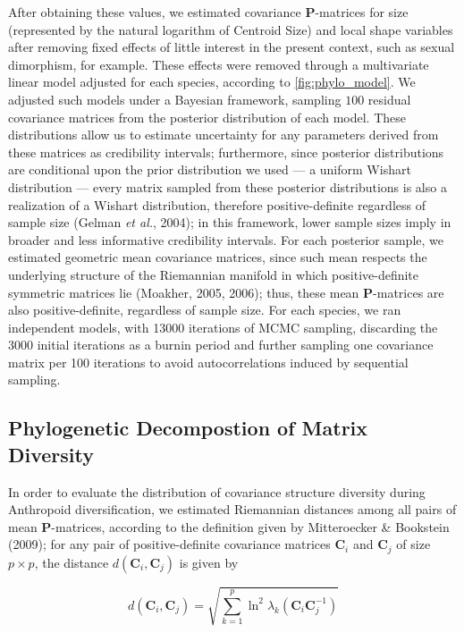 \documentclass[12pt,twoside]{report}
\begin{document}
After obtaining these values, we estimated covariance
$\mathbf{P}$-matrices for size (represented by the natural logarithm of
Centroid Size) and local shape variables after removing fixed effects of
little interest in the present context, such as sexual dimorphism, for
example. These effects were removed through a multivariate linear model
adjusted for each species, according to \autoref{fig:phylo_model}. We
adjusted such models under a Bayesian framework, sampling $100$ residual
covariance matrices from the posterior distribution of each model. These
distributions allow us to estimate uncertainty for any parameters
derived from these matrices as credibility intervals; furthermore, since
posterior distributions are conditional upon the prior distribution we
used --- a uniform Wishart distribution --- every matrix sampled from
these posterior distributions is also a realization of a Wishart
distribution, therefore positive-definite regardless of sample size
(Gelman \emph{et al.}, 2004); in this framework, lower sample sizes
imply in broader and less informative credibility intervals. For each
posterior sample, we estimated geometric mean covariance matrices, since
such mean respects the underlying structure of the Riemannian manifold
in which positive-definite symmetric matrices lie (Moakher, 2005, 2006);
thus, these mean $\mathbf{P}$-matrices are also positive-definite,
regardless of sample size. For each species, we ran independent models,
with 13000 iterations of MCMC sampling, discarding the 3000 initial
iterations as a burnin period and further sampling one covariance matrix
per 100 iterations to avoid autocorrelations induced by sequential
sampling.

\subsection{Phylogenetic Decompostion of Matrix
Diversity}\label{phylogenetic-decompostion-of-matrix-diversity}

In order to evaluate the distribution of covariance structure diversity
during Anthropoid diversification, we estimated Riemannian distances
among all pairs of mean $\mathbf{P}$-matrices, according to the
definition given by Mitteroecker \& Bookstein (2009); for any pair of
positive-definite covariance matrices $\mathbf{C}_i$ and $\mathbf{C}_j$
of size $p \times p$, the distance $d(\mathbf{C}_i, \mathbf{C}_j)$ is
given by

\begin{equation}
d(\mathbf{C}_i, \mathbf{C}_j) = \sqrt{\sum_{k = 1}^p \ln^2 \lambda_k(\mathbf{C}_i\mathbf{C}_j^{-1})}
\label{eq:riemdist}
\end{equation}
\end{document}
